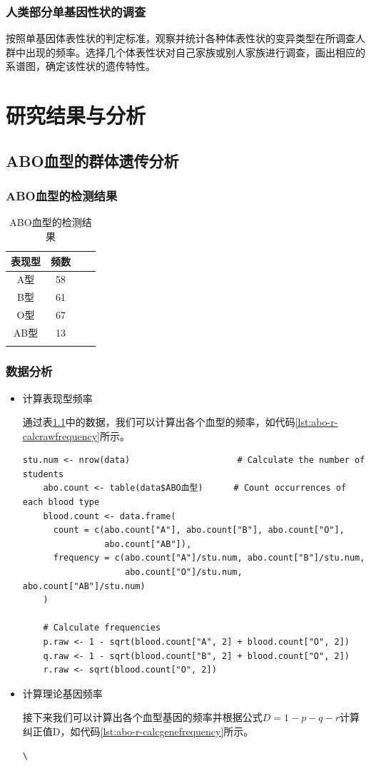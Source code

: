 \documentclass[AutoFakeBold]{LZUThesis}
\begin{document}
\begin{enumerate}
\subsection{人类部分单基因性状的调查}
按照单基因体表性状的判定标准，观察并统计各种体表性状的变异类型在所调查人群中出现的频率。选择几个体表性状对自己家族或别人家族进行调查，画出相应的系谱图，确定该性状的遗传特性。

\chapter{研究结果与分析}
\section{ABO血型的群体遗传分析}
\subsection{ABO血型的检测结果}
\begin{longtable}{cccc}
    \toprule
    表现型 & 频数 \\
    \midrule
    A型 & 58 \\
    B型 & 61 \\
    O型 & 67 \\
    AB型 & 13 \\
    \bottomrule
    \caption{ABO血型的检测结果}
    \label{tbl:ABOcount}
\end{longtable}
\subsection{数据分析}
\begin{itemize}
    \item 计算表现型频率\par
    通过表\ref{tbl:ABOcount}中的数据，我们可以计算出各个血型的频率，如代码\ref{lst:abo-r-calcrawfrequency}所示。
    \begin{lstlisting}[caption={计算频率}, label={lst:abo-r-calcrawfrequency}, style=myRstyle]
    stu.num <- nrow(data)                     # Calculate the number of students
    abo.count <- table(data$ABO血型)      # Count occurrences of each blood type
    blood.count <- data.frame(
      count = c(abo.count["A"], abo.count["B"], abo.count["O"],
                abo.count["AB"]),
      frequency = c(abo.count["A"]/stu.num, abo.count["B"]/stu.num,
                    abo.count["O"]/stu.num, abo.count["AB"]/stu.num)
    )

    # Calculate frequencies
    p.raw <- 1 - sqrt(blood.count["A", 2] + blood.count["O", 2])
    q.raw <- 1 - sqrt(blood.count["B", 2] + blood.count["O", 2])
    r.raw <- sqrt(blood.count["O", 2])
    \end{lstlisting}
    \item 计算理论基因频率\par
    接下来我们可以计算出各个血型基因的频率并根据公式$D=1-p-q-r$计算纠正值D，如代码\ref{lst:abo-r-calcgenefrequency}所示。
    \begin{lstlisting}[caption={计算理论基因频率}, label={lst:abo-r-calcgenefrequency}, style=myRstyle]\


\end{lstlisting}
\end{itemize}
\end{enumerate}
\end{document}
